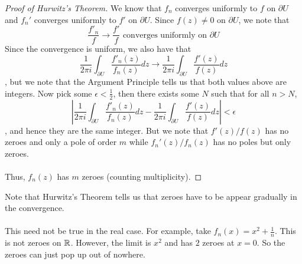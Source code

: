 \documentclass{article}
\begin{document}
\begin{proof}[Proof of Hurwitz's Theorem]
    We know that $f_n$ converges uniformly to $f$ on $\partial U$ and $f_n'$ converges uniformly to $f'$ on $\partial U$. Since $f(z) \neq 0$ on $\partial U$, we note that
    \[\frac{f'_n}{f} \to \frac{f'}{f} \text{ converges uniformly on $\partial U$}\]
    Since the convergence is uniform, we also have that
    \[\frac{1}{2\pi i} \int_{\partial U} \frac{f'_n(z)}{f_n(z)} dz \to \frac{1}{2\pi i} \int_{\partial U} \frac{f'(z)}{f(z)} dz\]
    , but we note that the Argument Principle tells us that both values above are integers. Now pick some $\epsilon < \frac{1}{2}$, then there exists some $N$ such that for all $n > N$,
    \[|\frac{1}{2\pi i} \int_{\partial U} \frac{f'_n(z)}{f_n(z)} dz - \frac{1}{2\pi i} \int_{\partial U} \frac{f'(z)}{f(z)} dz| < \epsilon\]
    , and hence they are the same integer. But we note that $f'(z)/f(z)$ has no zeroes and only a pole of order $m$ while $f_n'(z)/f_n(z)$ has no poles but only zeroes.\\\\
    Thus, $f_n(z)$ has $m$ zeroes (counting multiplicity).
\end{proof}

\begin{remark}
    Note that Hurwitz's Theorem tells us that zeroes have to be appear gradually in the convergence.\\\\
    This need not be true in the real case. For example, take $f_n(x) = x^2 + \frac{1}{n}$. This is not zeroes on $\mathbb{R}$. However, the limit is $x^2$ and has $2$ zeroes at $x = 0$. So the zeroes can just pop up out of nowhere.
\end{remark}
\end{document}
